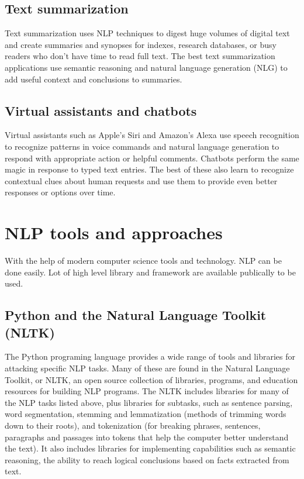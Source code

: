 \documentclass[11pt]{article}
\begin{document}
\subsection{Text summarization}
\label{sec:org685837d}
Text summarization uses NLP techniques to digest huge volumes of digital text and
create summaries and synopses for indexes, research databases, or busy readers who
don't have time to read full text. The best text summarization applications use
semantic reasoning and natural language generation (NLG) to add useful context
and conclusions to summaries.

\subsection{Virtual assistants and chatbots}
\label{sec:org1212420}
Virtual assistants such as Apple's Siri and Amazon's Alexa use speech recognition
to recognize patterns in voice commands and natural language generation to respond
with appropriate action or helpful comments. Chatbots perform the same magic in
response to typed text entries. The best of these also learn to recognize contextual
clues about human requests and use them to provide even better responses or options
over time. 
\clearpage

\section{NLP tools and approaches}
\label{sec:org2587ae2}
With the help of modern computer science tools and technology. NLP can be done easily.
Lot of high level library and framework are available publically to be used.

\subsection{Python and the Natural Language Toolkit (NLTK)}
\label{sec:orga63c277}
The Python programing language provides a wide range of tools and libraries
for attacking specific NLP tasks. Many of these are found in the Natural Language
Toolkit, or NLTK, an open source collection of libraries, programs, and
education resources for building NLP programs.
The NLTK includes libraries for many of the NLP tasks listed above, plus libraries
for subtasks, such as sentence parsing, word segmentation, stemming and
lemmatization (methods of trimming words down to their roots), and tokenization
(for breaking phrases, sentences, paragraphs and passages into tokens that help
the computer better understand the text). It also includes libraries for implementing
capabilities such as semantic reasoning, the ability to reach logical conclusions
based on facts extracted from text.
\end{document}

